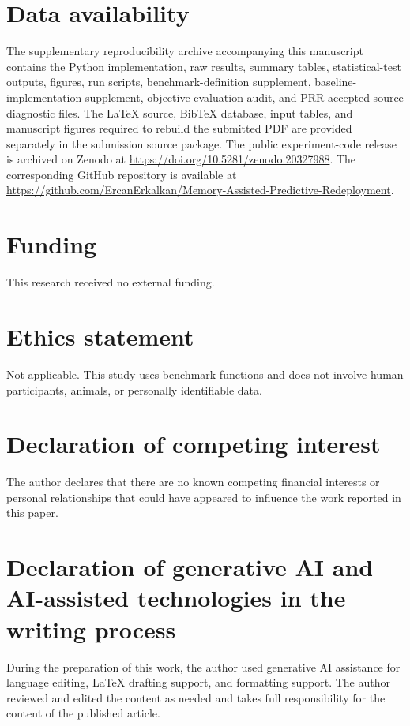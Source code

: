 \documentclass[1p,times]{elsarticle}
\begin{document}
\section*{Data availability}
The supplementary reproducibility archive accompanying this manuscript contains the Python implementation, raw results, summary tables, statistical-test outputs, figures, run scripts, benchmark-definition supplement, baseline-implementation supplement, objective-evaluation audit, and PRR accepted-source diagnostic files. The LaTeX source, BibTeX database, input tables, and manuscript figures required to rebuild the submitted PDF are provided separately in the submission source package. The public experiment-code release is archived on Zenodo at \url{https://doi.org/10.5281/zenodo.20327988}. The corresponding GitHub repository is available at \url{https://github.com/ErcanErkalkan/Memory-Assisted-Predictive-Redeployment}.

\section*{Funding}
This research received no external funding.

\section*{Ethics statement}
Not applicable. This study uses benchmark functions and does not involve human participants, animals, or personally identifiable data.

\section*{Declaration of competing interest}
The author declares that there are no known competing financial interests or personal relationships that could have appeared to influence the work reported in this paper.

\section*{Declaration of generative AI and AI-assisted technologies in the writing process}
During the preparation of this work, the author used generative AI assistance for language editing, LaTeX drafting support, and formatting support. The author reviewed and edited the content as needed and takes full responsibility for the content of the published article.

{\small


}
\end{document}
